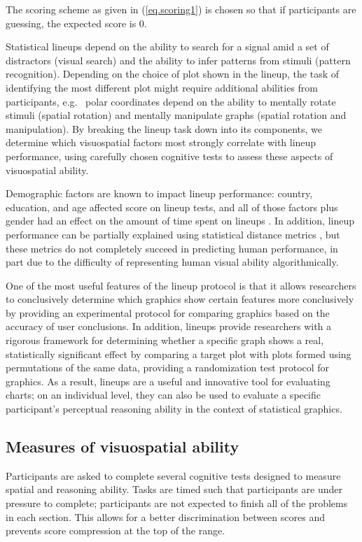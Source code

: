 \documentclass[11pt]{isuthesis}\usepackage[]{graphicx}\usepackage[]{color}
\begin{document}
The scoring scheme as given in (\ref{eq.scoring1}) is chosen so that if participants are guessing, the expected score is 0. 

Statistical lineups depend on the ability to search for a signal amid a set of distractors (visual search) and the ability to infer patterns from stimuli (pattern recognition). Depending on the choice of plot shown in the lineup, the task of identifying the most different plot might require additional abilities from   participants, e.g.~ polar coordinates depend on the ability to mentally rotate stimuli (spatial rotation) and mentally manipulate graphs (spatial rotation and manipulation). By breaking the lineup task down into its components, we  determine which visuospatial factors most strongly correlate with lineup performance, using carefully chosen cognitive tests to assess these aspects of visuospatial ability. 

Demographic factors are known to impact lineup performance: country, education, and age affected score on lineup tests, and all of those factors plus gender had an effect on the amount of time spent on lineups \citep{humanfactorslineups}. In addition, lineup performance can be partially explained using statistical distance metrics \citep{distancemetriclineups}, but these metrics do not completely succeed in predicting human performance, in part due to the difficulty of representing human visual ability algorithmically.


One of the most useful features of the lineup protocol is that it allows researchers to conclusively determine which graphics show certain features more conclusively by providing an experimental protocol for comparing graphics based on the accuracy of user conclusions. In addition, lineups provide researchers with a rigorous framework for determining whether a specific graph shows a real, statistically significant effect by comparing a target plot with plots formed using permutations of the same data, providing a randomization test protocol for graphics. As a result, lineups are a useful and innovative tool for evaluating charts; on an individual level, they can also be used to evaluate a specific participant's perceptual reasoning ability in the context of statistical graphics.


\subsection{Measures of visuospatial ability}

Participants are asked to complete several cognitive tests designed to measure spatial and reasoning ability. Tasks are timed such  that participants are under  pressure to complete; participants are not expected to finish all of the problems in each section. This allows for a better discrimination between scores and prevents score compression at the top of the range. 
\end{document}
